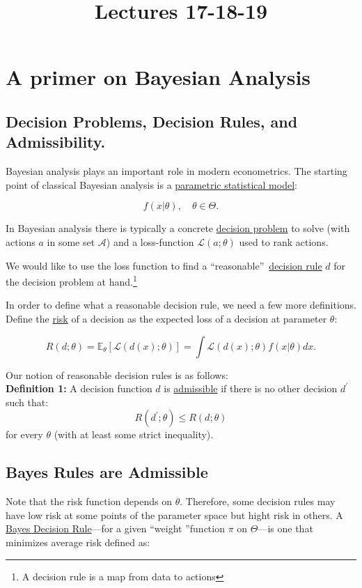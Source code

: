 \documentclass[12] {article}
\begin{document}
\onehalfspace

\title{Lectures 17-18-19}
\date{}
\maketitle


\section{A primer on Bayesian Analysis}

\subsection{Decision Problems, Decision Rules, and Admissibility.}

Bayesian analysis plays an important role in modern econometrics. The starting point of classical Bayesian analysis is a \underline{parametric statistical model}:

\[ f(x | \theta), \quad \theta \in \Theta. \]

\noindent In Bayesian analysis there is typically a concrete \underline{decision problem} to solve (with actions $a$ in some set $\mathcal{A}$) and a loss-function $\mathcal{L}(a;\theta)$ used to rank actions. 

We would like to use the loss function to find a ``reasonable\textquotedblright\, \underline{decision rule} $d$ for the decision problem at hand.\footnote{A decision rule is a map from data to actions} 

In order to define what a reasonable decision rule, we need a few more definitions. Define the \underline{risk} of a decision as the expected loss of a decision at parameter $\theta$:

\[ R(d; \theta) = \mathbb{E}_{\theta}[ \mathcal{L}(d(x); \theta) ] = \int  \mathcal{L}(d(x); \theta) f(x|\theta) d x.   \]

\noindent 

Our notion of reasonable decision rules is as follows: \\

\noindent \textbf{Definition 1:} A decision function $d$ is \underline{admissible} if there is no other decision $d^{\prime}$ such that:
\[ R(d^{\prime}; \theta) \leq R(d; \theta) \]
for every $\theta$ (with at least some strict inequality). \\

\subsection{Bayes Rules are Admissible}
Note that the risk function depends on $\theta$. Therefore, some decision rules may have low risk at some points of the parameter space but hight risk in others. A \underline{Bayes Decision Rule}---for a given ``weight \textquotedblright function $\pi$ on $\Theta$---is one that minimizes average risk defined as:
\end{document}
